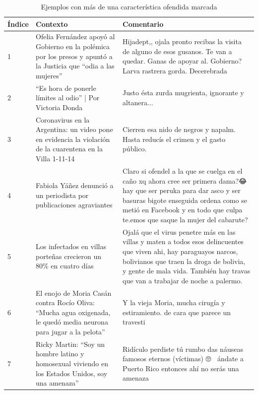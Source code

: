 \begin{table}[t]
    \small
    \begin{tabularx}{\textwidth}{lXX}
        \toprule
        Índice & Contexto        & Comentario \\
        \midrule
        1 & Ofelia Fernández apoyó al Gobierno en la polémica por los presos y apuntó a la Justicia que ``odia a las mujeres''  & Hijadept,, ojala pronto recibas la visita de alguno de esos gusanos. Te van a quedar. Ganas de apoyar al. Gobierno? Larva rastrera gorda. Decerebrada\\%
        2 & ``Es hora de ponerle límites al odio'' | Por Victoria Donda &  Justo ésta zurda mugrienta, ignorante y altanera... \\%
        3 &Coronavirus en la Argentina: un video pone en evidencia la violación de la cuarentena en la Villa 1-11-14 & Cierren esa nido de negros y napalm. Hasta reducís el crimen y el gasto público.\\%
        4 & Fabiola Yáñez denunció a un periodista por publicaciones agraviantes & Claro si ofendel a la que se cuelga en el caño xq ahora cree ser primera dama?😂 hay que ser peruka para dar asco y ser basuras bigote enseguida ordena como se metió en Facebook y en todo que culpa te.emos que saque la mujer del cabarute? \\ %
        5 & Los infectados en villas porteñas crecieron un 80\% en cuatro días & Ojalá que el virus penetre más en las villas y maten a todos esos delincuentes que viven ahi, hay paraguayos narcos, bolivianos que traen la droga de bolivia, y gente de mala vida. También hay travas que van a trabajar de noche a palermo.\\%
        6 & El enojo de Moria Casán contra Rocío Oliva: ``Mucha agua oxigenada, le quedó media neurona para jugar a la pelota'' & Y la vieja Moria, mucha cirugía y estiramiento. de cara que parece un travesti \\
        7 & Ricky Martin: ``Soy un hombre latino y homosexual viviendo en los Estados Unidos, soy una amenaza'' & Ridículo perdiste tú rumbo das náuseas 🤮 famosos eternos (víctimas) 🙄🤦‍♀️ ándate a Puerto Rico entonces ahí no serás una amenaza\\ %
    \end{tabularx}
    \label{tab:multi_char_examples}
    \caption{Ejemplos con más de una característica ofendida marcada}
\end{table}





